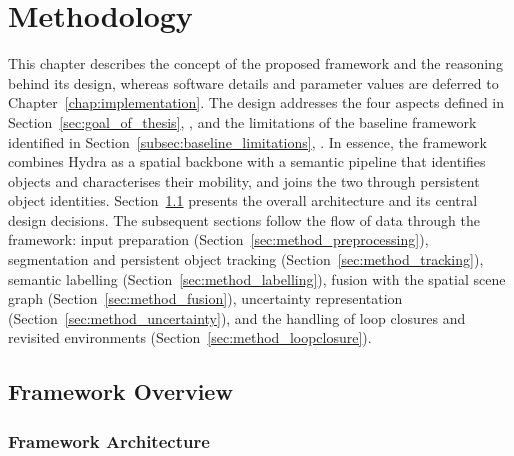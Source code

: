 \chapter{Methodology}
\label{chap:methodology}

{\small This chapter describes the concept of the proposed framework and the reasoning behind its design, whereas software details and parameter values are deferred to Chapter~\ref{chap:implementation}. The design addresses the four aspects defined in Section~\ref{sec:goal_of_thesis}, \textit{}, and the limitations of the baseline framework~\cite{previous_rsg_thesis} identified in Section~\ref{subsec:baseline_limitations}, \textit{}. In essence, the framework combines Hydra as a spatial backbone with a semantic pipeline that identifies objects and characterises their mobility, and joins the two through persistent object identities. Section~\ref{sec:method_overview} presents the overall architecture and its central design decisions. The subsequent sections follow the flow of data through the framework: input preparation (Section~\ref{sec:method_preprocessing}), segmentation and persistent object tracking (Section~\ref{sec:method_tracking}), semantic labelling (Section~\ref{sec:method_labelling}), fusion with the spatial scene graph (Section~\ref{sec:method_fusion}), uncertainty representation (Section~\ref{sec:method_uncertainty}), and the handling of loop closures and revisited environments (Section~\ref{sec:method_loopclosure}).\par}

\section{Framework Overview}
\label{sec:method_overview}

\subsection{Framework Architecture}
\label{subsec:method_architecture}

